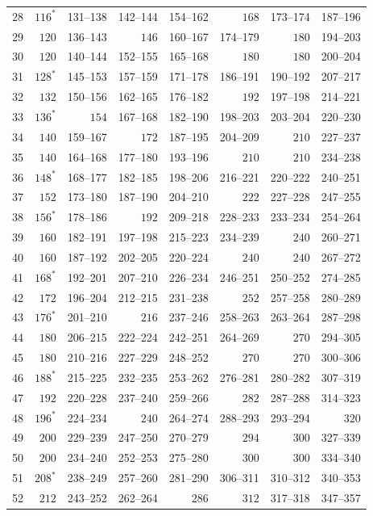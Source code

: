 \begin{longtable}{@{}r*{7}{r}@{}}
28&\(116^{*}\)&131--138&142--144&154--162&\(168\)&173--174&187--196\\
29&\(120\)&136--143&\(146\)&160--167&174--179&\(180\)&194--203\\
30&\(120\)&140--144&152--155&165--168&\(180\)&\(180\)&200--204\\
31&\(128^{*}\)&145--153&157--159&171--178&186--191&190--192&207--217\\
32&\(132\)&150--156&162--165&176--182&\(192\)&197--198&214--221\\
33&\(136^{*}\)&\(154\)&167--168&182--190&198--203&203--204&220--230\\
34&\(140\)&159--167&\(172\)&187--195&204--209&\(210\)&227--237\\
35&\(140\)&164--168&177--180&193--196&\(210\)&\(210\)&234--238\\
36&\(148^{*}\)&168--177&182--185&198--206&216--221&220--222&240--251\\
37&\(152\)&173--180&187--190&204--210&\(222\)&227--228&247--255\\
38&\(156^{*}\)&178--186&\(192\)&209--218&228--233&233--234&254--264\\
39&\(160\)&182--191&197--198&215--223&234--239&\(240\)&260--271\\
40&\(160\)&187--192&202--205&220--224&\(240\)&\(240\)&267--272\\
41&\(168^{*}\)&192--201&207--210&226--234&246--251&250--252&274--285\\
42&\(172\)&196--204&212--215&231--238&\(252\)&257--258&280--289\\
43&\(176^{*}\)&201--210&\(216\)&237--246&258--263&263--264&287--298\\
44&\(180\)&206--215&222--224&242--251&264--269&\(270\)&294--305\\
45&\(180\)&210--216&227--229&248--252&\(270\)&\(270\)&300--306\\
46&\(188^{*}\)&215--225&232--235&253--262&276--281&280--282&307--319\\
47&\(192\)&220--228&237--240&259--266&\(282\)&287--288&314--323\\
48&\(196^{*}\)&224--234&\(240\)&264--274&288--293&293--294&\(320\)\\
49&\(200\)&229--239&247--250&270--279&\(294\)&\(300\)&327--339\\
50&\(200\)&234--240&252--253&275--280&\(300\)&\(300\)&334--340\\
51&\(208^{*}\)&238--249&257--260&281--290&306--311&310--312&340--353\\
52&\(212\)&243--252&262--264&\(286\)&\(312\)&317--318&347--357\\

\end{longtable}

